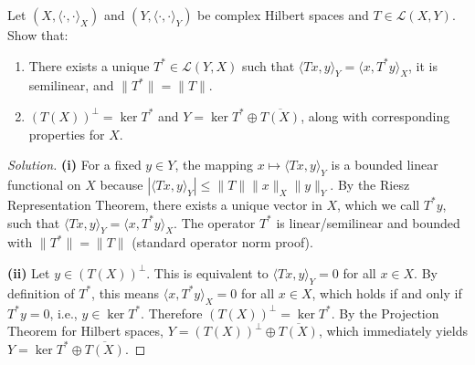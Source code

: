 \documentclass{article}
\begin{document}
	\begin{problem}
		Let $(X, \langle\cdot,\cdot\rangle_X)$ and $(Y, \langle\cdot,\cdot\rangle_Y)$ be complex Hilbert spaces and $T \in \mathcal{L}(X,Y)$. Show that:
		\begin{enumerate}
		    \item[(i)] There exists a unique $T^* \in \mathcal{L}(Y,X)$ such that $\langle Tx,y \rangle_Y = \langle x,T^*y \rangle_X$, it is semilinear, and $\|T^*\| = \|T\|$.
		    \item[(ii)] $(T(X))^\perp = \ker T^*$ and $Y = \ker T^* \oplus \overline{T(X)}$, along with corresponding properties for $X$.
		\end{enumerate}
	\end{problem}
    \begin{proof}[Solution]
        \textbf{(i)} For a fixed $y \in Y$, the mapping $x \mapsto \langle Tx, y \rangle_Y$ is a bounded linear functional on $X$ because $|\langle Tx, y \rangle_Y| \le \|T\| \|x\|_X \|y\|_Y$. By the Riesz Representation Theorem, there exists a unique vector in $X$, which we call $T^*y$, such that $\langle Tx, y \rangle_Y = \langle x, T^*y \rangle_X$. The operator $T^*$ is linear/semilinear and bounded with $\|T^*\| = \|T\|$ (standard operator norm proof).
        
        \textbf{(ii)} Let $y \in (T(X))^\perp$. This is equivalent to $\langle Tx, y \rangle_Y = 0$ for all $x \in X$. By definition of $T^*$, this means $\langle x, T^*y \rangle_X = 0$ for all $x \in X$, which holds if and only if $T^*y = 0$, i.e., $y \in \ker T^*$. Therefore $(T(X))^\perp = \ker T^*$. By the Projection Theorem for Hilbert spaces, $Y = (T(X))^\perp \oplus \overline{T(X)}$, which immediately yields $Y = \ker T^* \oplus \overline{T(X)}$.
    \end{proof}
\end{document}
